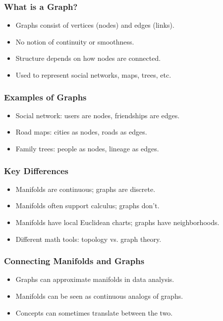 \begin{frame}[fragile]\frametitle{What is a Graph?}
    \begin{itemize}
        \item Graphs consist of vertices (nodes) and edges (links).
        \item No notion of continuity or smoothness.
        \item Structure depends on how nodes are connected.
        \item Used to represent social networks, maps, trees, etc.
    \end{itemize}
\end{frame}

\begin{frame}[fragile]\frametitle{Examples of Graphs}
    \begin{itemize}
        \item Social network: users are nodes, friendships are edges.
        \item Road maps: cities as nodes, roads as edges.
        \item Family trees: people as nodes, lineage as edges.
    \end{itemize}
\end{frame}

\begin{frame}[fragile]\frametitle{Key Differences}
    \begin{itemize}
        \item Manifolds are continuous; graphs are discrete.
        \item Manifolds often support calculus; graphs don't.
        \item Manifolds have local Euclidean charts; graphs have neighborhoods.
        \item Different math tools: topology vs. graph theory.
    \end{itemize}
\end{frame}

\begin{frame}[fragile]\frametitle{Connecting Manifolds and Graphs}
    \begin{itemize}
        \item Graphs can approximate manifolds in data analysis.
        \item Manifolds can be seen as continuous analogs of graphs.
        \item Concepts can sometimes translate between the two.
    \end{itemize}
\end{frame}

